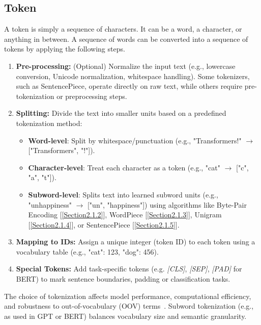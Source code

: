 \subsection{Token}\label{Section2.1.1}
A token is simply a sequence of characters. It can be a word, a character, or anything in between.
A sequence of words can be converted into a sequence of tokens by applying the following steps.
\begin{enumerate}
    \item \textbf{Pre-processing:} (Optional) Normalize the input text (e.g., lowercase conversion, Unicode normalization, whitespace handling). Some tokenizers, such as SentencePiece, operate directly on raw text, while others require pre-tokenization or preprocessing steps.

    \item \textbf{Splitting:} Divide the text into smaller units based on a predefined tokenization method:
    \begin{itemize}
        \item \textbf{Word-level}: Split by whitespace/punctuation (e.g., "Transformers!" $\rightarrow$ ["Transformers", "!"]).
        \item \textbf{Character-level}: Treat each character as a token (e.g., "cat" $\rightarrow$ ["c", "a", "t"]).
        \item \textbf{Subword-level}: Splits text into learned subword units (e.g., "unhappiness" $\rightarrow$ ["un", "happiness"]) using algorithms like Byte-Pair Encoding [\ref{Section2.1.2}], WordPiece [\ref{Section2.1.3}], Unigram [\ref{Section2.1.4}], or SentencePiece [\ref{Section2.1.5}].
    \end{itemize}
    \item \textbf{Mapping to IDs:} Assign a unique integer (token ID) to each token using a vocabulary table (e.g., {"cat": 123, "dog": 456}).
    
    \item \textbf{Special Tokens:} Add task-specific tokens (e.g. \textit{[CLS]}, \textit{[SEP]}, \textit{[PAD]} for BERT) to mark sentence boundaries, padding or classification tasks.
\end{enumerate}
The choice of tokenization affects model performance, computational efficiency, and robustness to out-of-vocabulary (OOV) terms~\cite{bostrom2022byte}.
Subword tokenization (e.g., as used in GPT or BERT) balances vocabulary size and semantic granularity.



